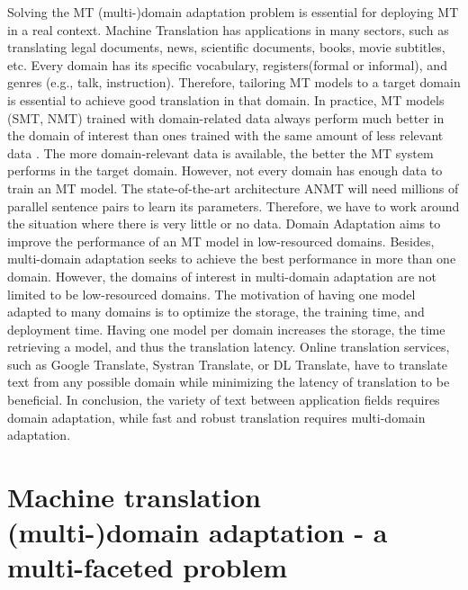 Solving the MT (multi-)domain adaptation problem is essential for deploying MT in a real context. Machine Translation has applications in many sectors, such as translating legal documents, news, scientific documents, books, movie subtitles, etc. Every domain has its specific vocabulary, registers(formal or informal), and genres (e.g., talk, instruction). Therefore, tailoring MT models to a target domain is essential to achieve good translation in that domain. In practice, MT models (SMT, NMT) trained with domain-related data always perform much better in the domain of interest than ones trained with the same amount of less relevant data \citep{Rico13domain, Saunders21Domain}. The more domain-relevant data is available, the better the MT system performs in the target domain. However, not every domain has enough data to train an MT model. The state-of-the-art architecture ANMT will need millions of parallel sentence pairs to learn its parameters. Therefore, we have to work around the situation where there is very little or no data. Domain Adaptation aims to improve the performance of an MT model in low-resourced domains. Besides, multi-domain adaptation seeks to achieve the best performance in more than one domain. However, the domains of interest in multi-domain adaptation are not limited to be low-resourced domains. The motivation of having one model adapted to many domains is to optimize the storage, the training time, and deployment time. Having one model per domain increases the storage, the time retrieving a model, and thus the translation latency. Online translation services, such as Google Translate, Systran Translate, or DL Translate, have to translate text from any possible domain while minimizing the latency of translation to be beneficial. In conclusion, the variety of text between application fields requires domain adaptation, while fast and robust translation requires multi-domain adaptation.

\section{Machine translation (multi-)domain adaptation - a multi-faceted problem}
\label{sec:multi-facet}
